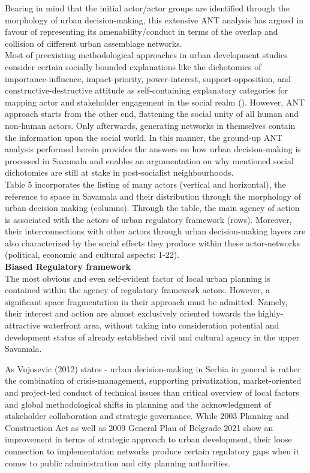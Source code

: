\documentclass[11pt]{report}
\begin{document}
Bearing in mind that the initial actor/actor groups are identified through the morphology of urban decision-making, this extensive ANT analysis has argued in favour of representing its amenability/conduct in terms of the overlap and collision of different urban assemblage networks.
\\

Most of preexisting methodological approaches in urban development studies consider certain socially bounded explanations {like the dichotomies of importance-influence, impact-priority, power-interest, support-opposition, and constructive-destructive attitude} as self-containing explanatory categories for mapping actor and stakeholder engagement in the social realm (\href{ref}{\citealt{mathur_defining_2007}}).
However, ANT approach starts from the other end, flattening the social unity of all human and non-human actors.
Only afterwards, generating networks in themselves contain the information upon the social world.
In this manner, the ground-up ANT analysis performed herein provides the answers on how urban decision-making is processed in Savamala and enables an argumentation on why mentioned social dichotomies are still at stake in post-socialist neighbourhoods.
\\
Table 5 %
incorporates the listing of many actors (vertical and horizontal), the reference to space in Savamala and their distribution through the morphology of urban decision making (columns).
Through the table, the main agency of action is associated with the actors of urban regulatory framework (rows).
Moreover, their interconnections  with other actors through urban decision-making layers are also characterized by the social effects they produce within these actor-networks (political, economic and cultural aspects: 1-22).
\\

\textbf{Biased Regulatory framework}
\\
The most obvious and even self-evident factor of local urban planning is contained within the agency of regulatory framework actors.
However, a significant space fragmentation in their approach must be admitted. Namely, their interest and action are almost exclusively oriented towards the highly-attractive waterfront area, without taking into consideration potential and development status of already established civil and cultural agency in the upper Savamala.

As Vujosevic (2012) states - urban decision-making in Serbia in general is rather the combination of crisis-management, supporting privatization, market-oriented and project-led conduct of technical issues than critical overview of local factors and global methodological shifts in planning and the acknowledgment of stakeholder collaboration and strategic governance.
While 2003 Planning and Construction Act as well as 2009 General Plan of Belgrade 2021 show an improvement in terms of strategic approach to urban development, their loose connection to implementation networks produce certain regulatory gaps when it comes to public administration and city planning authorities.
\end{document}
